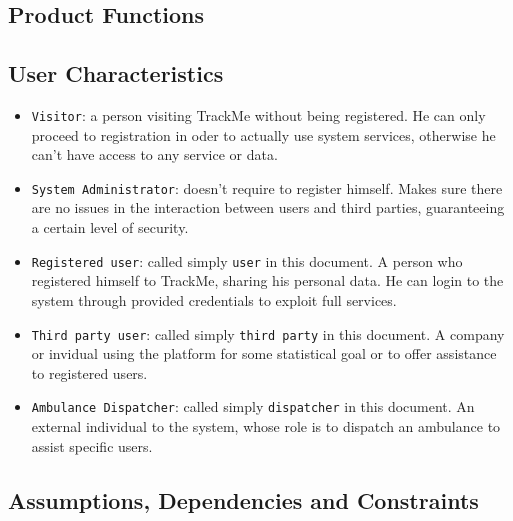 \documentclass[12pt,a4paper]{article}
\begin{document}
	\newpage
	\subsection{Product Functions}
	
	\subsection{User Characteristics}
		\begin{itemize}
			\item \texttt{Visitor}: a person visiting TrackMe without being registered. He can only proceed to registration in oder to actually use system services, otherwise he can't have access to any service or data.
			\item \texttt{System Administrator}: doesn't require to register himself. Makes sure there are no issues in the interaction between users and third parties, guaranteeing a certain level of security.
			\item \texttt{Registered user}: called simply \texttt{user} in this document. A person who registered himself to TrackMe, sharing his personal data. He can login to the system through provided credentials to exploit full services.
			\item \texttt{Third party user}: called simply \texttt{third party} in this document. A company or invidual using the platform for some statistical goal or to offer assistance to registered users.
			\item \texttt{Ambulance Dispatcher}: called simply \texttt{dispatcher} in this document. An external individual to the system, whose role is to dispatch an ambulance to assist specific users.
		\end{itemize}
	
	\subsection{Assumptions, Dependencies and Constraints}
\end{document}
